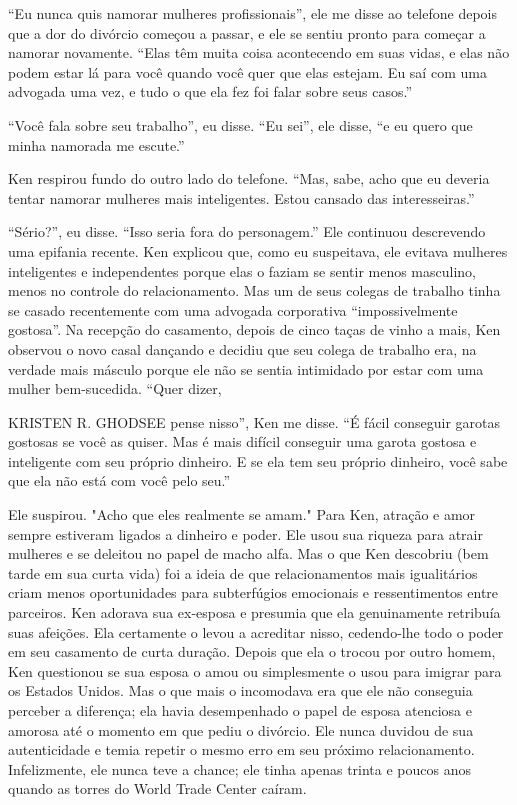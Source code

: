  \par 
“Eu nunca quis namorar mulheres profissionais”, ele me disse ao telefone depois que a dor do divórcio começou a passar, e ele se sentiu pronto para começar a namorar novamente. “Elas têm muita coisa acontecendo em suas vidas, e elas não podem estar lá para você quando você quer que elas estejam. Eu saí com uma advogada uma vez, e tudo o que ela fez foi falar sobre seus casos.”
 \par 
“Você fala sobre seu trabalho”, eu disse. “Eu sei”, ele disse, “e eu quero que minha namorada me escute.”
 \par 
Ken respirou fundo do outro lado do telefone. “Mas, sabe, acho que eu deveria tentar namorar mulheres mais inteligentes. Estou cansado das interesseiras.”
 \par 
“Sério?”, eu disse. “Isso seria fora do personagem.” Ele continuou descrevendo uma epifania recente. Ken explicou que, como eu suspeitava, ele evitava mulheres inteligentes e independentes porque elas o faziam se sentir menos masculino, menos no controle do relacionamento. Mas um de seus colegas de trabalho tinha se casado recentemente com uma advogada corporativa “impossivelmente gostosa”. Na recepção do casamento, depois de cinco taças de vinho a mais, Ken observou o novo casal dançando e decidiu que seu colega de trabalho era, na verdade mais másculo porque ele não se sentia intimidado por estar com uma mulher bem-sucedida. “Quer dizer,
 \par 
KRISTEN R. GHODSEE pense nisso”, Ken me disse. “É fácil conseguir garotas gostosas se você as quiser. Mas é mais difícil conseguir uma garota gostosa e inteligente com seu próprio dinheiro. E se ela tem seu próprio dinheiro, você sabe que ela não está com você pelo seu.”
 \par 
Ele suspirou. "Acho que eles realmente se amam." Para Ken, atração e amor sempre estiveram ligados a dinheiro e poder. Ele usou sua riqueza para atrair mulheres e se deleitou no papel de macho alfa. Mas o que Ken descobriu (bem tarde em sua curta vida) foi a ideia de que relacionamentos mais igualitários criam menos oportunidades para subterfúgios emocionais e ressentimentos entre parceiros. Ken adorava sua ex-esposa e presumia que ela genuinamente retribuía suas afeições. Ela certamente o levou a acreditar nisso, cedendo-lhe todo o poder em seu casamento de curta duração. Depois que ela o trocou por outro homem, Ken questionou se sua esposa o amou ou simplesmente o usou para imigrar para os Estados Unidos. Mas o que mais o incomodava era que ele não conseguia perceber a diferença; ela havia desempenhado o papel de esposa atenciosa e amorosa até o momento em que pediu o divórcio. Ele nunca duvidou de sua autenticidade e temia repetir o mesmo erro em seu próximo relacionamento. Infelizmente, ele nunca teve a chance; ele tinha apenas trinta e poucos anos quando as torres do World Trade Center caíram.
